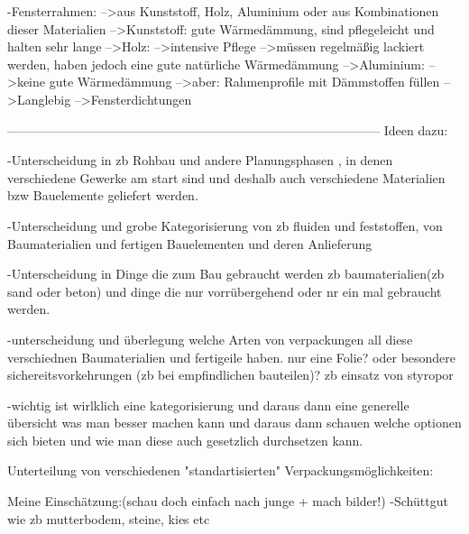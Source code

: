                         -Fensterrahmen:
                            -->aus Kunststoff, Holz, Aluminium oder aus Kombinationen dieser Materialien
                                -->Kunststoff: gute Wärmedämmung, sind pflegeleicht und halten sehr lange
                                -->Holz: 
                                    -->intensive Pflege
                                    -->müssen regelmäßig lackiert werden, haben jedoch eine gute natürliche Wärmedämmung
                                -->Aluminium: 
                                    -->keine gute Wärmedämmung
                                        -->aber: Rahmenprofile mit Dämmstoffen füllen
                                    -->Langlebig
                                -->Fensterdichtungen
                                
-----------------------------------------------------------------------------------------             
        Ideen dazu:                        
                                
        -Unterscheidung in zb Rohbau und andere Planungsphasen , in denen verschiedene Gewerke am start sind und deshalb auch verschiedene Materialien bzw Bauelemente geliefert werden.
        
        -Unterscheidung und grobe Kategorisierung von zb fluiden und feststoffen, von Baumaterialien und fertigen Bauelementen und deren Anlieferung
        
        -Unterscheidung in Dinge die zum Bau gebraucht werden zb baumaterialien(zb sand oder beton) und dinge die nur vorrübergehend oder nr ein mal gebraucht werden.
        
        -unterscheidung und überlegung welche Arten von verpackungen all diese verschiednen Baumaterialien und fertigeile haben. nur eine Folie? oder besondere sichereitsvorkehrungen (zb bei empfindlichen bauteilen)? zb einsatz von styropor
        
        -wichtig ist wirlklich eine kategorisierung und daraus dann eine generelle übersicht was man besser machen kann und daraus dann schauen welche optionen sich bieten und wie man diese auch gesetzlich durchsetzen kann.
                                
        
        
        
    Unterteilung von verschiedenen "standartisierten" Verpackungsmöglichkeiten:
        
            Meine Einschätzung:(schau doch einfach nach junge + mach bilder!)
                -Schüttgut wie zb mutterbodem, steine, kies etc
                
